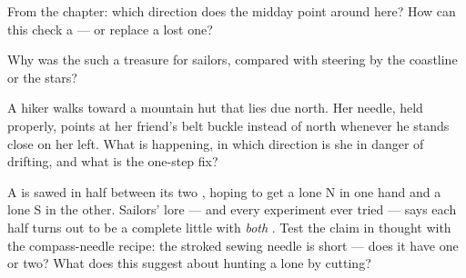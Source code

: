 \begin{exercise}[$\star$]\label{exo:g4:magnets-and-compass:8}
From the  chapter: which direction does the midday 
point around here? How can this check a  --- or replace a
lost one?
\end{exercise}

\begin{exercise}[$\star$]\label{exo:g4:magnets-and-compass:9}
Why was the  such a treasure for sailors, compared with
steering by the coastline or the stars?
\end{exercise}

\begin{exercise}[$\star\star$]\label{exo:g4:magnets-and-compass:10}
A hiker walks toward a mountain hut that lies due north. Her
 needle, held properly, points at her friend's belt buckle
instead of north whenever he stands close on her left. What is
happening, in which direction is she in danger of drifting, and
what is the one-step fix?
\end{exercise}

\begin{exercise}[$\star\star$]\label{exo:g4:magnets-and-compass:11}
A  is sawed in half between its two , hoping to get a
lone N in one hand and a lone S in the other. Sailors' lore --- and
every experiment ever tried --- says each half turns out to be a
complete little  with \emph{both} . Test the claim in
thought with the compass-needle recipe: the stroked sewing needle
is short --- does it have one  or two? What does this suggest
about hunting a lone  by cutting?
\end{exercise}
